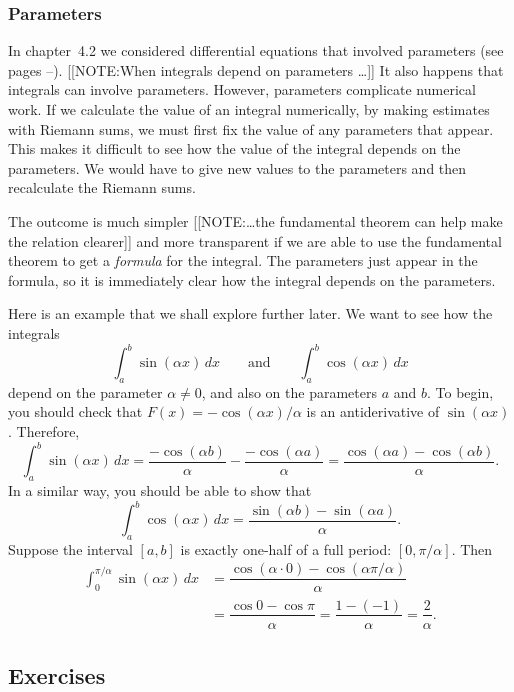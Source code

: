 \subsubsection{Parameters}
\label{subsubsec:parameters}

In chapter~4.2 we considered differential equations that involved
parameters (see pages \pageref{DEs w/ params-begin}--\pageref{DEs w/
  params-end}).
[[NOTE:When integrals depend on parameters \ldots]]
It also happens that integrals can involve parameters.  However,
parameters complicate numerical work.  If we calculate the value of an
integral numerically, by making estimates with Riemann sums, we must
first fix the value of any parameters that appear.  This makes it
difficult to see how the value of the integral depends on the
parameters.  We would have to give new values to the parameters and
then recalculate the Riemann sums.

	The outcome is much simpler 
	[[NOTE:\ldots the fundamental theorem can help make the relation clearer]]
and more transparent if we are able to use the fundamental theorem to get a {\em formula\/} for the integral.  The parameters just appear in the formula, so it is immediately clear how the integral depends on the parameters.  

	Here is an example that we shall explore further later.  We want to see how the integrals
	\[
\int_a^b \sin(\alpha x) \, dx \qquad \mbox{and}
		\qquad \int_a^b \cos(\alpha x) \, dx
\] 
depend on the parameter $\alpha \neq 0$, and also on the parameters
$a$ and $b$.  To begin, you should check that $F(x) = -\cos(\alpha
x)/\alpha$ is an antiderivative of $\sin(\alpha x)$.  Therefore,
\[
\int_a^b \sin(\alpha x) \, dx =
	\dfrac{-\cos(\alpha b)}{\alpha} - 
		\dfrac{-\cos(\alpha a)}{\alpha}
		= \dfrac{\cos(\alpha a) -\cos(\alpha b)}{\alpha}.
\]
In a similar way, you should be able to show that
\[
\int_a^b \cos(\alpha x) \, dx = 
		\dfrac{\sin(\alpha b) - \sin(\alpha a)}{\alpha}.
\]
Suppose the interval $[a, b]$ is exactly one-half of a full period:
$[0, \pi/\alpha]$.  Then
\begin{align*}
\int_0^{\pi/\alpha} \sin(\alpha x) \, dx &=
	\dfrac{\cos(\alpha \cdot 0) -\cos(\alpha \pi/\alpha)}{\alpha}\\
		&= \dfrac{\cos{0} - \cos{\pi}}{\alpha}
		= \dfrac{1 - (-1)}{\alpha} 
		= \dfrac{2}{\alpha}.
\end{align*}


\subsection{Exercises}
\label{subsec:exercises}

